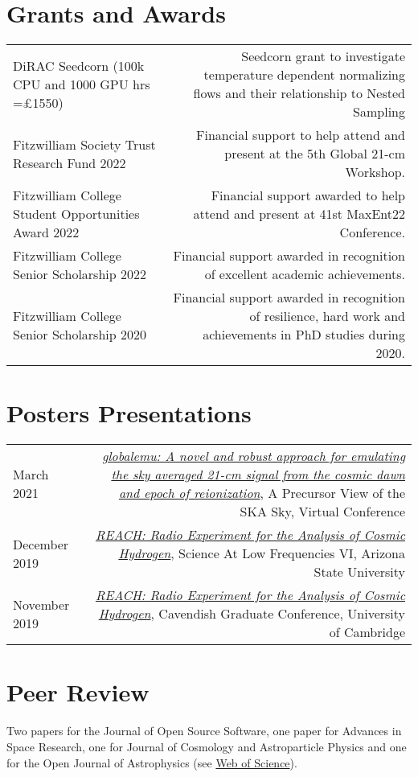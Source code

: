 \documentclass{article}
\begin{document}
\section*{Grants and Awards}

\begin{tabular}{l!{\vrule}r}
    DiRAC Seedcorn (100k CPU and 1000 GPU hrs =£1550) & Seedcorn grant to investigate temperature dependent normalizing flows and their relationship to Nested Sampling \\
    Fitzwilliam Society Trust Research Fund 2022 & Financial support to help attend and present at the 5th Global 21-cm Workshop. \\
	Fitzwilliam College Student Opportunities Award 2022 & Financial support awarded to help attend and present at 41st MaxEnt22 Conference. \\
	Fitzwilliam College Senior Scholarship 2022 & Financial support awarded in recognition of excellent academic achievements. \\
	Fitzwilliam College Senior Scholarship 2020 & Financial support awarded in recognition of resilience, hard work and achievements in PhD studies during 2020.
\end{tabular}

\section*{Posters Presentations}

\begin{tabular}{L!{\vrule}R}
	March 2021 & \href{https://github.com/htjb/Talks/blob/master/Posters/SKA_globalemu_March_2021/globalemu.pdf}{\textit{globalemu: A novel and robust approach for emulating the sky averaged 21-cm signal from the cosmic dawn and epoch of reionization}}, A Precursor View of the SKA Sky, Virtual Conference\\
	December 2019 & \href{https://drive.google.com/file/d/1dvgumyu4cXxXqoYxikU3DKOa4u_gpGzn/view}{\textit{REACH: Radio Experiment for the Analysis of Cosmic Hydrogen}}, Science At Low Frequencies VI, Arizona State University \\
	November 2019 & \href{https://github.com/htjb/Talks/blob/master/Posters/Cav_Graduate_Conf_REACH_Nov_2019/REACH_poster.pdf}{\textit{REACH: Radio Experiment for the Analysis of Cosmic Hydrogen}}, Cavendish Graduate Conference, University of Cambridge
\end{tabular}

\section*{Peer Review}
Two papers for the Journal of Open Source Software, one paper for Advances in Space Research, one for Journal of Cosmology and Astroparticle Physics and one for the Open Journal of Astrophysics (see \href{https://www.webofscience.com/wos/author/record/3920858}{Web of Science}).
\end{document}
